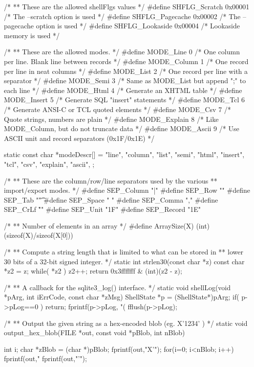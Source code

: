 \begin{Codex}[label=shell.c,numbers=left]
/*
** These are the allowed shellFlgs values
*/
#define SHFLG_Scratch     0x00001     /* The --scratch option is used */
#define SHFLG_Pagecache   0x00002     /* The --pagecache option is used */
#define SHFLG_Lookaside   0x00004     /* Lookaside memory is used */

/*
** These are the allowed modes.
*/
#define MODE_Line     0  /* One column per line.  Blank line between records */
#define MODE_Column   1  /* One record per line in neat columns */
#define MODE_List     2  /* One record per line with a separator */
#define MODE_Semi     3  /* Same as MODE_List but append ";" to each line */
#define MODE_Html     4  /* Generate an XHTML table */
#define MODE_Insert   5  /* Generate SQL "insert" statements */
#define MODE_Tcl      6  /* Generate ANSI-C or TCL quoted elements */
#define MODE_Csv      7  /* Quote strings, numbers are plain */
#define MODE_Explain  8  /* Like MODE_Column, but do not truncate data */
#define MODE_Ascii    9  /* Use ASCII unit and record separators (0x1F/0x1E) */

static const char *modeDescr[] = {
  "line",
  "column",
  "list",
  "semi",
  "html",
  "insert",
  "tcl",
  "csv",
  "explain",
  "ascii",
};

/*
** These are the column/row/line separators used by the various
** import/export modes.
*/
#define SEP_Column    "|"
#define SEP_Row       "\n"
#define SEP_Tab       "\t"
#define SEP_Space     " "
#define SEP_Comma     ","
#define SEP_CrLf      "\r\n"
#define SEP_Unit      "\x1F"
#define SEP_Record    "\x1E"

/*
** Number of elements in an array
*/
#define ArraySize(X)  (int)(sizeof(X)/sizeof(X[0]))

/*
** Compute a string length that is limited to what can be stored in
** lower 30 bits of a 32-bit signed integer.
*/
static int strlen30(const char *z){
  const char *z2 = z;
  while( *z2 ){ z2++; }
  return 0x3fffffff & (int)(z2 - z);
}

/*
** A callback for the sqlite3_log() interface.
*/
static void shellLog(void *pArg, int iErrCode, const char *zMsg){
  ShellState *p = (ShellState*)pArg;
  if( p->pLog==0 ) return;
  fprintf(p->pLog, "(%
  fflush(p->pLog);
}

/*
** Output the given string as a hex-encoded blob (eg. X'1234' )
*/
static void output_hex_blob(FILE *out, const void *pBlob, int nBlob){
  int i;
  char *zBlob = (char *)pBlob;
  fprintf(out,"X'");
  for(i=0; i<nBlob; i++){ fprintf(out,"%
  fprintf(out,"'");
}

}
\end{Codex}
